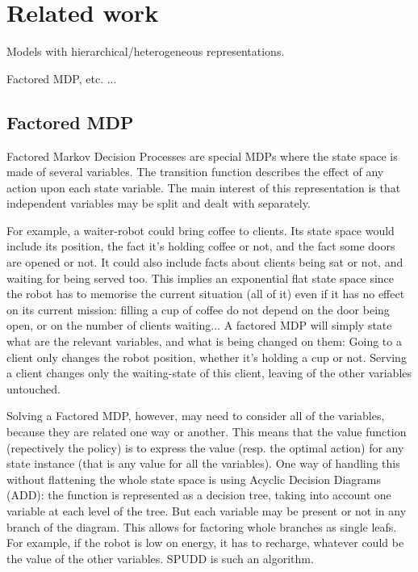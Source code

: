 \section{Related work}

Models with hierarchical/heterogeneous representations.

Factored MDP, etc. ...

\subsection{Factored MDP}

Factored Markov Decision Processes are special MDPs where the state space is made of several variables. The transition function describes the effect of any action upon each state variable. The main interest of this representation is that independent variables may be split and dealt with separately.

For example, a waiter-robot could bring coffee to clients. Its state space would include its position, the fact it's holding coffee or not, and the fact some doors are opened or not. It could also include facts about clients being sat or not, and waiting for being served too. This implies an exponential flat state space since the robot has to memorise the current situation (all of it) even if it has no effect on its current mission: filling a cup of coffee do not depend on the door being open, or on the number of clients waiting...
A factored MDP will simply state what are the relevant variables, and what is being changed on them: Going to a client only changes the robot position, whether it's holding a cup or not. Serving a client changes only the waiting-state of this client, leaving of the other variables untouched.

Solving a Factored MDP, however, may need to consider all of the variables, because they are related one way or another. This means that the value function (repectively the policy) is to express the value (resp. the optimal action) for any state instance (that is any value for all the variables). One way of handling this without flattening the whole state space is using Acyclic Decision Diagrams (ADD): the function is represented as a decision tree, taking into account one variable at each level of the tree. But each variable may be present or not in any branch of the diagram. This allows for factoring whole branches as single leafs. For example, if the robot is low on energy, it has to recharge, whatever could be the value of the other variables. SPUDD \cite{Hoey99spudd} is such an algorithm. 